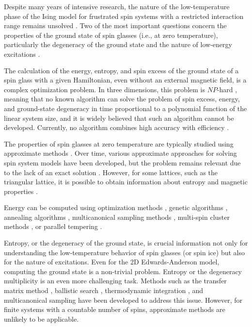 \documentclass[preprint,12pt]{elsarticle}
\begin{document}
	Despite many years of intensive research, the nature of the low-temperature phase of the Ising model for frustrated spin systems with a restricted interaction range remains unsolved \cite{roma2010ground, newman2023proof}. Two of the most important questions concern the properties of the ground state of spin glasses (i.e., at zero temperature), particularly the degeneracy of the ground state and the nature of low-energy excitations \cite{newman2022ground}.
	
	The calculation of the energy, entropy, and spin excess of the ground state of a spin glass with a given Hamiltonian, even without an external magnetic field, is a complex optimization problem. In three dimensions, this problem is $NP$-hard \cite{barahona1982computational, hartmann2002optimization}, meaning that no known algorithm can solve the problem of spin excess, energy, and ground-state degeneracy in time proportional to a polynomial function of the linear system size, and it is widely believed that such an algorithm cannot be developed. Currently, no algorithm combines high accuracy with efficiency \cite{fan2023searching}.
	
	The properties of spin glasses at zero temperature are typically studied using approximate methods \cite{roma2009ground, perez2012ground}. Over time, various approximate approaches for solving spin system models have been developed, but the problem remains relevant due to the lack of an exact solution \cite{rybin2022hybrid, makarova2023canonical, farias2024differentiable, jabar2024magnetic}. However, for some lattices, such as the triangular lattice, it is possible to obtain information about entropy and magnetic properties \cite{jurvcivsinova2024classical}.
	
	Energy can be computed using optimization methods \cite{hartmann2002optimization, hartmann2004new}, genetic algorithms \cite{holland1992adaptation}, annealing algorithms \cite{kirkpatrick1983optimization}, multicanonical sampling methods \cite{berg1994ground, shevchenko2017multicanonical}, multi-spin cluster methods \cite{makarova2023canonical}, or parallel tempering \cite{PhysRevB.50.16444, roma2009ground}.
	
	Entropy, or the degeneracy of the ground state, is crucial information not only for understanding the low-temperature behavior of spin glasses (or spin ice) but also for the nature of excitations. Even for the 2D Edwards-Anderson model, computing the ground state is a non-trivial problem. Entropy or the degeneracy multiplicity is an even more challenging task. Methods such as the transfer matrix method \cite{PhysRevB.22.288, cheung1983equilibrium, kolan1982ground}, ballistic search \cite{hartmann2000ground}, thermodynamic integration \cite{kirkpatrick1977frustration, binder1985monte, roma2004ground}, and multicanonical sampling \cite{berg1994ground, shevchenko2017multicanonical} have been developed to address this issue. However, for finite systems with a countable number of spins, approximate methods are unlikely to be applicable.  
	
\end{document}
